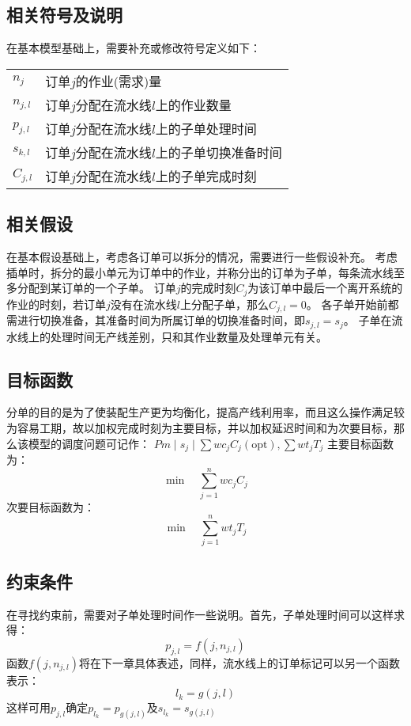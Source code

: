 \subsection{相关符号及说明}
在基本模型基础上，需要补充或修改符号定义如下：\\[3pt]
\begin{supertabular}{ll}
$n_j$ & 订单$j$的作业(需求)量\\
$n_{j,l}$ & 订单$j$分配在流水线$l$上的作业数量\\
$p_{j,l}$ & 订单$j$分配在流水线$l$上的子单处理时间\\
$s_{k,l}$ & 订单$j$分配在流水线$l$上的子单切换准备时间\\
$C_{j,l}$ & 订单$j$分配在流水线$l$上的子单完成时刻\\
\end{supertabular}

\subsection{相关假设}
在基本假设基础上，考虑各订单可以拆分的情况，需要进行一些假设补充。
考虑插单时，拆分的最小单元为订单中的作业，并称分出的订单为子单，每条流水线至多分配到某订单的一个子单。
订单$j$的完成时刻$C_j$为该订单中最后一个离开系统的作业的时刻，若订单$j$没有在流水线$l$上分配子单，那么$C_{j,l} = 0$。
各子单开始前都需进行切换准备，其准备时间为所属订单的切换准备时间，即$s_{j,l} = s_j$。
子单在流水线上的处理时间无产线差别，只和其作业数量及处理单元有关。
\subsection{目标函数}
分单的目的是为了使装配生产更为均衡化，提高产线利用率，而且这么操作满足较为容易工期，故以加权完成时刻为主要目标，并以加权延迟时间和为次要目标，那么该模型的调度问题可记作：
$Pm\mid s_j\mid \sum wc_jC_j(\text{opt}), \sum wt_jT_j$
主要目标函数为：
\begin{equation}
\min\quad \sum_{j = 1}^n  wc_jC_j
\label{equ:apartmainobj}
\end{equation}
次要目标函数为：
\begin{equation}
\min\quad \sum_{j = 1}^n wt_jT_j
\label{equ:apartsecondobj}
\end{equation}
\subsection{约束条件}
在寻找约束前，需要对子单处理时间作一些说明。首先，子单处理时间可以这样求得：
\begin{equation}
p_{j,l} = f(j, n_{j,l})
\end{equation}
函数$f(j, n_{j,l})$将在下一章具体表述，同样，流水线上的订单标记可以另一个函数表示：
\begin{equation}
l_k = g(j, l)
\end{equation}
这样可用$p_{j,l}$确定$p_{l_k} = p_{g(j,l)}$及$s_{l_k} = s_{g(j,l)}$

